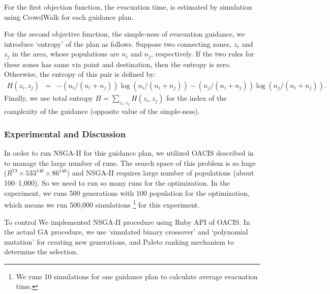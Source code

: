 For the first objection function, the evacuation time,
is estimated by simulation using CrowdWalk for each guidance plan.

For the second objective function, the simple-ness of evacuation guidance,
we introduce `entropy' of the plan as follows.
Suppose two connecting zones, $z_i$ and $z_j$ in the area,
whose populations are $n_i$ and $n_j$, respectively.
If the two rules for these zones has same via point and destination,
then the entropy is zero.
Otherwise, 
the entropy of this pair is defined by:
\begin{eqnarray}
  H(z_i,z_j) & = & - (n_i/(n_i + n_j))\log(n_i/(n_i + n_j))
                  - (n_j/(n_i + n_j))\log(n_j/(n_i + n_j))
                  .
                  \nonumber
\end{eqnarray}
Finally, we use total entropy $H = \sum_{z_i,z_j} H(z_i, z_j)$
for the index of the complexity of the guidance (opposite value
of the simple-ness).



\subsubsection{Experimental and Discussion}
\label{sss:nsga-experiment}

In order to run NSGA-II for this guidance plan,
we utilized OACIS described in  to manage the large number of runs.
The search space of this problem is so huge
($R^{73} \times 533^{146} \times 86^{146}$)
and NSGA-II requires large number of populations (about 100--1,000).
So we need to run so many runs for the optimization.
In the experiment, we runs 500 generations with 100 population
for the optimization,
which means we run 500,000 simulations
\footnote{We runs 10 simulations for one guidance plan
  to calculate average evacuation time.}
for this experiment.

To control 
We implemented NSGA-II procedure using Ruby API of OACIS.
In the actual GA procedure, we use `simulated binary crossover' and
`polynomial mutation' for creating new generations,
and Paleto ranking mechanism to determine the selection.


